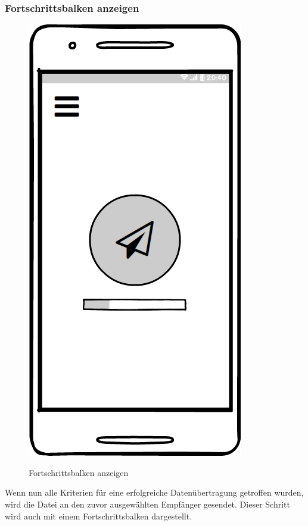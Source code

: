 \subsubsection{Fortschrittsbalken anzeigen}
\begin{figure}[H]
	\centering
	\includegraphics[width=.5\linewidth]{pictures/Mobile/Progress.png}\
	\caption{Fortschrittsbalken anzeigen}
\end{figure}
Wenn nun alle Kriterien für eine erfolgreiche Datenübertragung getroffen wurden, wird die Datei an den zuvor ausgewählten Empfänger gesendet. Dieser Schritt wird auch mit einem Fortschrittsbalken dargestellt.
